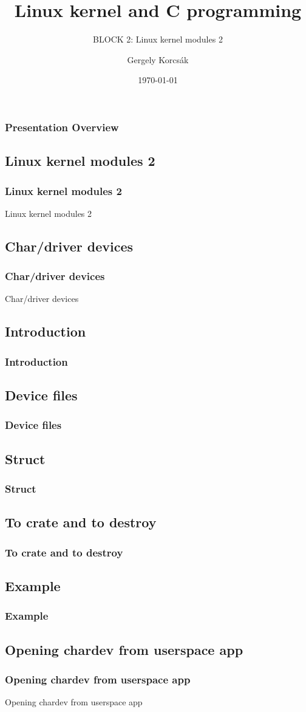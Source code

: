 \documentclass[
	11pt, %
]{beamer}
\title[Linux kernel and C programming]{Linux kernel and C programming}
\subtitle{BLOCK 2: Linux kernel modules 2}
\author[Gergely Korcsák]{Gergely Korcsák}
\institute[OE NIK]{Óbuda University \\ \smallskip \textit{korcsak.gergely@nik.uni-obuda.hu}}
\date[\today]{\today}
\newcommand{\sft}[1]{\section{#1}\frametitle{#1}\centering\LARGE#1}
\newcommand{\ssft}[1]{\subsection{#1}\frametitle{#1}}
\begin{document}

\begin{frame}
	\titlepage
\end{frame}


\begin{frame}
	\frametitle{Presentation Overview} %

	\tableofcontents %
\end{frame}


\begin{frame}
    \sft{Linux kernel modules 2}
\end{frame}

\begin{frame}
    \sft{Char/driver devices}
\end{frame}

\begin{frame}
    \ssft{Introduction}
\end{frame}

\begin{frame}
    \ssft{Device files}
\end{frame}

\begin{frame}
    \ssft{Struct}
\end{frame}

\begin{frame}
    \ssft{To crate and to destroy}
\end{frame}

\begin{frame}
    \ssft{Example}
\end{frame}


\begin{frame}
    \sft{Opening chardev from userspace app}
\end{frame}
\end{document}
